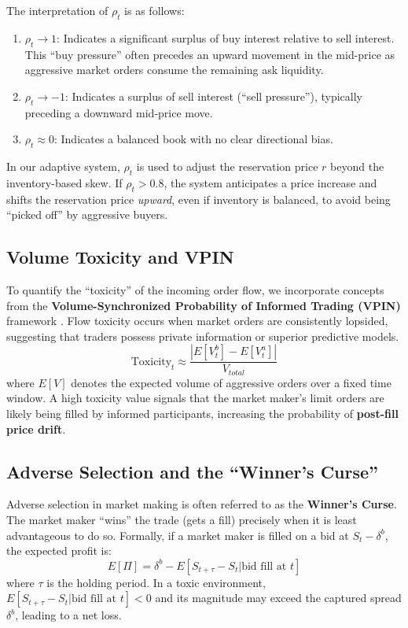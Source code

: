 The interpretation of $\rho_t$ is as follows:
\begin{enumerate}
    \item $\rho_t \rightarrow 1$: Indicates a significant surplus of buy interest relative to sell interest. This ``buy pressure'' often precedes an upward movement in the mid-price as aggressive market orders consume the remaining ask liquidity.
    \item $\rho_t \rightarrow -1$: Indicates a surplus of sell interest (``sell pressure''), typically preceding a downward mid-price move.
    \item $\rho_t \approx 0$: Indicates a balanced book with no clear directional bias.
\end{enumerate}
In our adaptive system, $\rho_t$ is used to adjust the reservation price $r$ beyond the inventory-based skew. If $\rho_t > 0.8$, the system anticipates a price increase and shifts the reservation price \textit{upward}, even if inventory is balanced, to avoid being ``picked off'' by aggressive buyers.

\subsection{Volume Toxicity and VPIN}
To quantify the ``toxicity'' of the incoming order flow, we incorporate concepts from the \textbf{Volume-Synchronized Probability of Informed Trading (VPIN)} framework \citep{Easley2012}. Flow toxicity occurs when market orders are consistently lopsided, suggesting that traders possess private information or superior predictive models.
\begin{equation}
    \text{Toxicity}_t \approx \frac{|E[V_t^b] - E[V_t^a]|}{V_{total}}
\end{equation}
where $E[V]$ denotes the expected volume of aggressive orders over a fixed time window. A high toxicity value signals that the market maker's limit orders are likely being filled by informed participants, increasing the probability of \textbf{post-fill price drift}.

\subsection{Adverse Selection and the ``Winner's Curse''}
Adverse selection in market making is often referred to as the \textbf{Winner's Curse}. The market maker ``wins'' the trade (gets a fill) precisely when it is least advantageous to do so. Formally, if a market maker is filled on a bid at $S_t - \delta^b$, the expected profit is:
\begin{equation}
    E[\Pi] = \delta^b - E[S_{t+\tau} - S_t | \text{bid fill at } t]
\end{equation}
where $\tau$ is the holding period. In a toxic environment, $E[S_{t+\tau} - S_t | \text{bid fill at } t] < 0$ and its magnitude may exceed the captured spread $\delta^b$, leading to a net loss.

